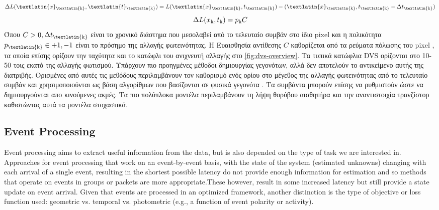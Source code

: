 \documentclass[12pt]{report}
\begin{document}
\begin{equation}
    \Delta L(\textlatin{x}\textsubscript{\textlatin{k}},\textlatin{t}\textsubscript{\textlatin{k}}) = L(\textlatin{x}\textsubscript{\textlatin{k}},t\textsubscript{\textlatin{k}})-(\textlatin{x}\textsubscript{\textlatin{k}},t\textsubscript{\textlatin{k}}-\Delta t\textsubscript{\textlatin{k}})
\end{equation}
\begin{equation}
   \Delta L(x\textsubscript{k},t\textsubscript{k}) = p\textsubscript{k}C 
\end{equation}
Όπου \(C > 0, \Delta t\textsubscript{\textlatin{k}}\) είναι το χρονικό διάστημα που μεσολαβεί από το τελευταίο συμβάν στο ίδιο \textlatin{pixel} και η πολικότητα \(p\textsubscript{\textlatin{k}} \in {+1,-1}\) είναι το πρόσημο της αλλαγής φωτεινότητας\cite{Lichtsteiner2008}. Η Ευαισθησία αντίθεσης $C$ καθορίζεται από τα ρεύματα πόλωσης του \textlatin{pixel} \cite{nozaki2017} \cite{Gallego2020}, τα οποία επίσης ορίζουν την ταχύτητα και το κατώφλι του ανιχνευτή αλλαγής στο \ref{fig:dvs-overview}. Τα τυπικά κατώφλια \textlatin{DVS} ορίζονται στο 10-50 τοις εκατό της αλλαγής φωτισμού. Υπάρχουν πιο προηγμένες μέθοδοι δημιουργίας γεγονότων, αλλά δεν αποτελούν το αντικείμενο αυτής της διατριβής. Ορισμένες από αυτές τις μεθόδους περιλαμβάνουν τον καθορισμό ενός ορίου στο μέγεθος της αλλαγής φωτεινότητας από το τελευταίο συμβάν και χρησιμοποιούνται ως βάση αλγορίθμων που βασίζονται σε φυσικά γεγονότα \cite{Gallego2019}. Τα συμβάντα μπορούν επίσης να ρυθμιστούν ώστε να δημιουργούνται απο κινούμενες ακμές. Τα πιο πολύπλοκα μοντέλα περιλαμβάνουν τη λήψη θορύβου αισθητήρα και την αναντιστοιχία τρανζίστορ καθιστώντας αυτά τα μοντέλα στοχαστικά.

\subsection{Event Processing}
Event processing aims to extract useful information from the data, but is also depended on the type of task we are interested in. Approaches for event processing that work on an event-by-event basis, with the state of the system (estimated unknowns) changing with each arrival of a single event, resulting in the shortest possible latency do not provide enough information for estimation and so methods that operate on events in groups or packets are more appropriate.These however, result in some increased latency but still provide a state update on event arrival. Given that events are processed in an optimized framework, another distinction is the type of objective or loss function used: geometric vs. temporal vs. photometric (e.g., a function of event polarity or activity).
\end{document}
